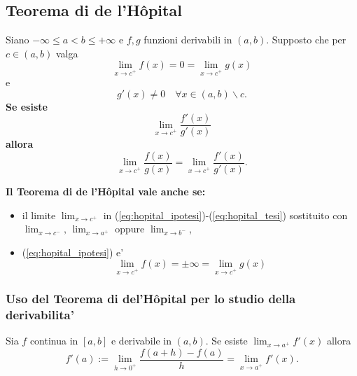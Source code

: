 \subsection{Teorema di de l'Hôpital}
\begin{theorem}[di de l'Hôpital]
    Siano $-\infty\leq a<b\leq +\infty$ e $f,g$ funzioni derivabili in $(a,b)$. Supposto che per $c\in(a,b)$ valga
    \begin{equation}\label{eq:hopital_ipotesi}
        \lim_{x\rightarrow c^+}f(x)=0=\lim_{x\rightarrow c^+}g(x)
    \end{equation}
    e
    \begin{equation*}
        g'(x)\neq 0\quad\forall x\in(a,b)\backslash c.
    \end{equation*}
    \textbf{Se esiste}
    \begin{equation}\label{eq:hopital_ipotesi2}
        \lim_{x\rightarrow c^+}\frac{f'(x)}{g'(x)}
    \end{equation}
    \textbf{allora}
    \begin{equation}\label{eq:hopital_tesi}
        \lim_{x\rightarrow c^+}\frac{f(x)}{g(x)}=\lim_{x\rightarrow c^+}\frac{f'(x)}{g'(x)}.
    \end{equation}
\end{theorem}

\textbf{Il Teorema di de l'Hôpital vale anche se:}
\begin{itemize}
    \item il limite $\lim_{x\rightarrow c^+}$ in (\ref{eq:hopital_ipotesi})-(\ref{eq:hopital_tesi}) sostituito con $\lim_{x\rightarrow c^-},\,\lim_{x\rightarrow a^+}$ oppure $\lim_{x\rightarrow b^-}$,
    \item (\ref{eq:hopital_ipotesi}) e'
    \begin{equation*}
        \lim_{x\rightarrow c^+}f(x)=\pm\infty=\lim_{x\rightarrow c^+}g(x)
    \end{equation*}
\end{itemize}

\subsubsection{Uso del Teorema di del'Hôpital per lo studio della derivabilita'}
\begin{proposition}
    Sia $f$ continua in $[a,b]$ e derivabile in $(a,b)$. Se esiste $\lim_{x\rightarrow a^+}f'(x)$ allora
    \begin{equation*}
        f'(a):=\lim_{h\rightarrow 0^+}\frac{f(a+h)-f(a)}{h}=\lim_{x\rightarrow a^+}f'(x).
    \end{equation*}
\end{proposition}

